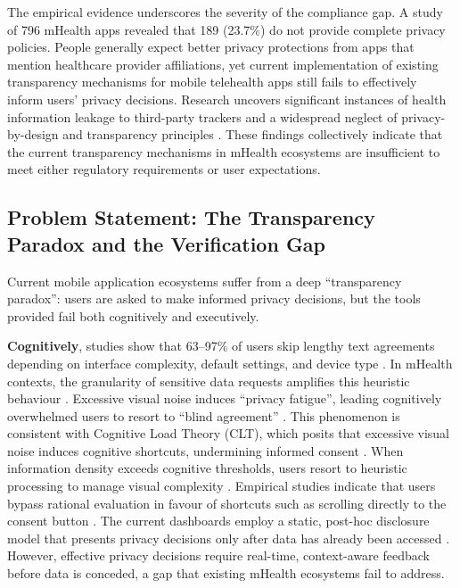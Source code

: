 The empirical evidence underscores the severity of the compliance gap. A study of 796 mHealth apps revealed that 189 (23.7\%) do not provide complete privacy policies. People generally expect better privacy protections from apps that mention healthcare provider affiliations, yet current implementation of existing transparency mechanisms for mobile telehealth apps still fails to effectively inform users' privacy decisions. Research uncovers significant instances of health information leakage to third-party trackers and a widespread neglect of privacy-by-design and transparency principles \cite{parker2021}. These findings collectively indicate that the current transparency mechanisms in mHealth ecosystems are insufficient to meet either regulatory requirements or user expectations.

\subsection{Problem Statement: The Transparency Paradox and the Verification Gap}

Current mobile application ecosystems suffer from a deep ``transparency paradox'': users are asked to make informed privacy decisions, but the tools provided fail both cognitively and executively.

\textbf{Cognitively}, studies show that 63--97\% of users skip lengthy text agreements depending on interface complexity, default settings, and device type \cite{steinfeld2016, obar2018}. In mHealth contexts, the granularity of sensitive data requests amplifies this heuristic behaviour \cite{dehling2015}. Excessive visual noise induces ``privacy fatigue'', leading cognitively overwhelmed users to resort to ``blind agreement'' \cite{choi2018}. This phenomenon is consistent with Cognitive Load Theory (CLT), which posits that excessive visual noise induces cognitive shortcuts, undermining informed consent \cite{sweller1988}. When information density exceeds cognitive thresholds, users resort to heuristic processing to manage visual complexity \cite{piaget2013, van2010}. Empirical studies indicate that users bypass rational evaluation in favour of shortcuts such as scrolling directly to the consent button \cite{steinfeld2016}. The current dashboards employ a static, post-hoc disclosure model that presents privacy decisions only after data has already been accessed \cite{schaub2015}. However, effective privacy decisions require real-time, context-aware feedback before data is conceded, a gap that existing mHealth ecosystems fail to address.

